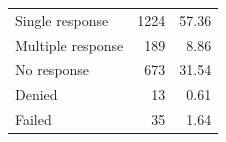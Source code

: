 \begin{table}
\centering
\begin{tabular}[t]{lrr}
\toprule
Single response & 1224 & 57.36\\
Multiple response & 189 & 8.86\\
No response & 673 & 31.54\\
Denied & 13 & 0.61\\
Failed & 35 & 1.64\\
\bottomrule
\end{tabular}
\end{table}
